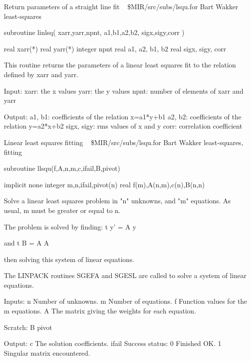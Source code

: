 %
\noindent Return parameters of a straight line fit
\newline \ 
\newline {} \$MIR/src/subs/lsqu.for
\newline {} Bart Wakker
\newline {} least-squares
\par{\tenpoint
{\eightpoint\begintt
      subroutine linlsq( xarr,yarr,npnt, a1,b1,a2,b2, sigx,sigy,corr )

      real           xarr(*)
      real           yarr(*)
      integer        npnt
      real           a1, a2, b1, b2
      real           sigx, sigy, corr

 This routine returns the parameters of a linear least squares fit to the
 relation defined by xarr and yarr.

 Input:
   xarr:         the x values
   yarr:         the y values
   npnt:         number of elements of xarr and yarr

 Output:
   a1, b1:       coefficients of the relation x=a1*y+b1
   a2, b2:       coefficients of the relation y=a2*x+b2
   sigx, sigy:   rms values of x and y
   corr:         correlation coefficient
\endtt}
\par}
%
\noindent Linear least squares fitting
\newline \ 
\newline {} \$MIR/src/subs/lsqu.for
\newline {} Bart Wakker
\newline \abox{Keywords:} least-squares, fitting
\par{\tenpoint
{\eightpoint\begintt
        subroutine llsqu(f,A,n,m,c,ifail,B,pivot)

        implicit none
        integer m,n,ifail,pivot(n)
        real f(m),A(n,m),c(n),B(n,n)

  Solve a linear least squares problem in "n" unknowns, and "m" equations.
  As usual, m must be greater or equal to n.

  The problem is solved by finding:
                                       t
                                 y' = A y

  and                                  t
                                 B  = A A

  then solving this system of linear equations.

  The LINPACK routines SGEFA and SGESL are called to solve a system of
  linear equations.

  Inputs:
    n          Number of unknowns.
    m          Number of equations.
    f          Function values for the m equations.
    A          The matrix giving the weights for each equation.

  Scratch:
    B
    pivot

  Output:
    c          The solution coefficients.
    ifail      Success status:
                 0     Finished OK.
                 1     Singular matrix encountered.
\endtt}
\par}
